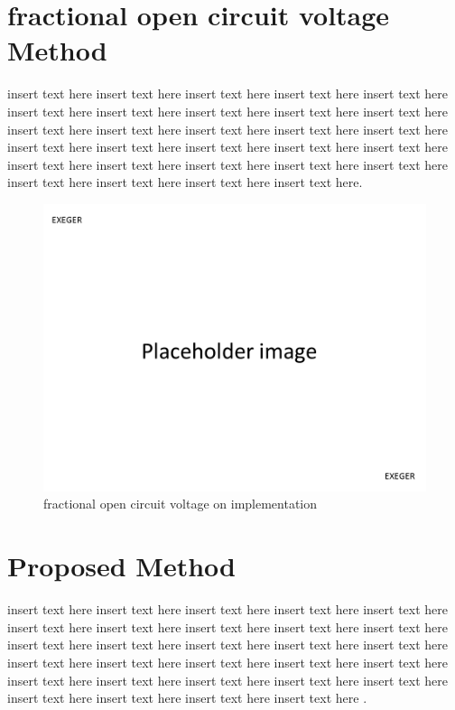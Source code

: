  \section{fractional open circuit voltage Method }
 insert text here insert text here insert text here insert text here insert text here
 insert text here insert text here insert text here insert text here insert text here insert text here insert text here insert text here insert text here insert text here insert text here insert text here insert text here insert text here insert text here insert text here insert text here insert text here insert text here insert text here insert text here insert text here insert text here insert text here.   \\
 \begin{figure}[H]
  \begin{center}
  \includegraphics[width=\textwidth]{images/pacehold}
  \caption{ fractional open circuit voltage on implementation}
  \label{fig:Frac_oc_result}
  \end{center}
  \end{figure}
\section{Proposed Method }
insert text here insert text here insert text here insert text here insert text here
insert text here insert text here insert text here insert text here insert text here insert text here insert text here insert text here insert text here insert text here insert text here insert text here insert text here insert text here insert text here insert text here insert text here insert text here insert text here insert text here insert text here insert text here insert text here insert text here . \\
